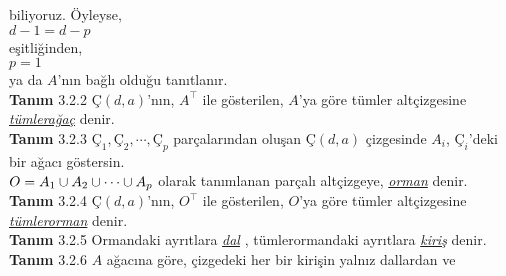 \documentclass{article}
\begin{document}
biliyoruz. Öyleyse,\\

\hspace{10mm}$d -1 = d - p$ \\

eşitliğinden,\\

\hspace{10mm}$p=1$\\

ya da $A$'nın bağlı olduğu tanıtlanır.\\

\textbf{Tanım} 3.2.2  $Ç(d,a)$'nın, $A^{\top}$ ile gösterilen, $A$'ya göre tümler altçizgesine 
\textit{
\underline{tümlerağaç}
} denir.\\

\textbf{Tanım} 3.2.3 
$Ç_{1}, Ç_{2}, \cdots, Ç_{p}$ 
parçalarından oluşan $Ç(d,a)$ çizgesinde 
$A_{i}$, $Ç_{i}$'deki bir ağacı göstersin.\\
$O = A_{1} \cup A_{2} \cup \cdots \cup A_{p}$ 
olarak tanımlanan parçalı altçizgeye, 
\textit{
\underline{orman}
} denir.\\

\textbf{Tanım} 3.2.4 $Ç(d,a)$'nın, $O^{\top}$ ile gösterilen, $O$'ya göre tümler altçizgesine 
\textit{
\underline{tümlerorman}
} denir.\\

\textbf{Tanım} 3.2.5 Ormandaki ayrıtlara 
\textit{
\underline{dal}
}, tümlerormandaki ayrıtlara 
\textit{
\underline{kiriş}
} denir.\\

\textbf{Tanım} 3.2.6 $A$ ağacına göre, çizgedeki her bir kirişin yalnız dallardan ve
\end{document}
